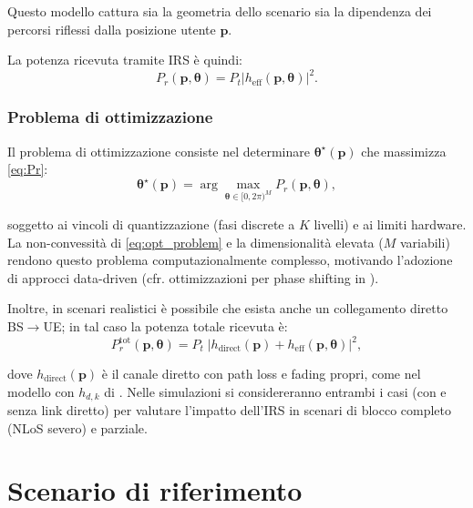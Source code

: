 \documentclass[12pt,a4paper]{report}
\begin{document}
Questo modello cattura sia la geometria dello scenario sia la
dipendenza dei percorsi riflessi dalla posizione utente $\mathbf{p}$.

La potenza ricevuta tramite IRS è quindi:
\begin{equation}
  P_r(\mathbf{p}, \boldsymbol{\theta}) = P_t \left|
  h_{\mathrm{eff}}(\mathbf{p}, \boldsymbol{\theta}) \right|^2.
  \label{eq:Pr}
\end{equation}

\subsection{Problema di ottimizzazione}
Il problema di ottimizzazione consiste nel determinare
$\boldsymbol{\theta}^\star(\mathbf{p})$ che massimizza \eqref{eq:Pr}:
\begin{equation}
  \boldsymbol{\theta}^\star(\mathbf{p}) = \arg\max_{\boldsymbol{\theta}
  \in [0, 2\pi)^M} P_r(\mathbf{p}, \boldsymbol{\theta}),
  \label{eq:opt_problem}
\end{equation}

soggetto ai vincoli di quantizzazione (fasi discrete a $K$ livelli) e
ai limiti hardware. La non-convessità di \eqref{eq:opt_problem} e la
dimensionalità elevata ($M$ variabili) rendono questo problema
computazionalmente complesso, motivando l'adozione di approcci
data-driven (cfr. ottimizzazioni per phase shifting in \cite{guo2021cascaded}).

Inoltre, in scenari realistici è possibile che esista anche un
collegamento diretto BS$\rightarrow$UE; in tal caso la potenza totale
ricevuta è:
\begin{equation}
  P_r^{\text{tot}}(\mathbf{p}, \boldsymbol{\theta}) = P_t\;\left|
  h_{\text{direct}}(\mathbf{p}) + h_{\text{eff}}(\mathbf{p},
  \boldsymbol{\theta}) \right|^2,
  \label{eq:P_r_tot}
\end{equation}

dove $h_{\text{direct}}(\mathbf{p})$ è il canale diretto con path
loss e fading propri, come nel modello con $h_{d,k}$ di
\cite{guo2021cascaded}. Nelle simulazioni si considereranno entrambi
i casi (con e senza link diretto) per valutare l'impatto dell'IRS in
scenari di blocco completo (NLoS severo) e parziale.

\chapter{Scenario di riferimento}
\label{chap:scenario}
\end{document}
